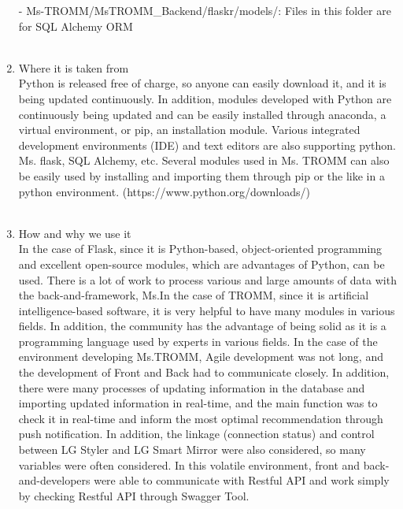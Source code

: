 \documentclass[conference]{IEEEtran}
\begin{document}
\begin{enumerate}
        \item[-] Ms-TROMM/MsTROMM\_Backend/flaskr/models/: Files in this folder are for SQL Alchemy ORM \\ \\
    \item Where it is taken from\\
    Python is released free of charge, so anyone can easily download it, and it is being updated continuously. In addition, modules developed with Python are continuously being updated and can be easily installed through anaconda, a virtual environment, or pip, an installation module. Various integrated development environments (IDE) and text editors are also supporting python. Ms. flask, SQL Alchemy, etc. Several modules used in Ms. TROMM can also be easily used by installing and importing them through pip or the like in a python environment. (https://www.python.org/downloads/) \\ \\
    \item How and why we use it\\
    In the case of Flask, since it is Python-based, object-oriented programming and excellent open-source modules, which are advantages of Python, can be used. There is a lot of work to process various and large amounts of data with the back-and-framework, Ms.In the case of TROMM, since it is artificial intelligence-based software, it is very helpful to have many modules in various fields. In addition, the community has the advantage of being solid as it is a programming language used by experts in various fields. In the case of the environment developing Ms.TROMM, Agile development was not long, and the development of Front and Back had to communicate closely. In addition, there were many processes of updating information in the database and importing updated information in real-time, and the main function was to check it in real-time and inform the most optimal recommendation through push notification. In addition, the linkage (connection status) and control between LG Styler and LG Smart Mirror were also considered, so many variables were often considered. In this volatile environment, front and back-and-developers were able to communicate with Restful API and work simply by checking Restful API through Swagger Tool. \\ \\
\end{enumerate}
\end{document}
